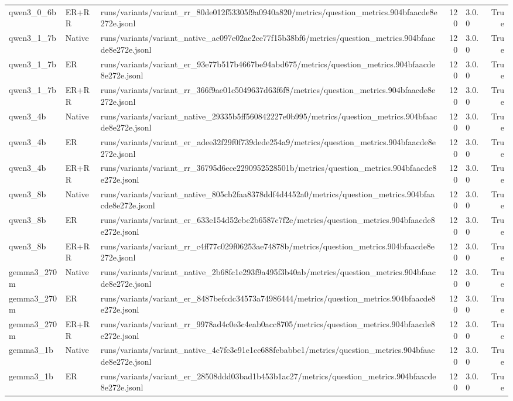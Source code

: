 \begin{tabular}{lllrlr}
qwen3_0_6b & ER+RR & runs/variants/variant_rr_80de012f53305f9a0940a820/metrics/question_metrics.904bfaacde8e272e.jsonl & 120 & 3.0.0 & True \\
qwen3_1_7b & Native & runs/variants/variant_native_ac097e02ae2ce77f15b38bf6/metrics/question_metrics.904bfaacde8e272e.jsonl & 120 & 3.0.0 & True \\
qwen3_1_7b & ER & runs/variants/variant_er_93e77b517b4667be94abd675/metrics/question_metrics.904bfaacde8e272e.jsonl & 120 & 3.0.0 & True \\
qwen3_1_7b & ER+RR & runs/variants/variant_rr_366f9ae01c5049637d63f6f8/metrics/question_metrics.904bfaacde8e272e.jsonl & 120 & 3.0.0 & True \\
qwen3_4b & Native & runs/variants/variant_native_29335b5ff560842227e0b995/metrics/question_metrics.904bfaacde8e272e.jsonl & 120 & 3.0.0 & True \\
qwen3_4b & ER & runs/variants/variant_er_adee32f29f0f739dede254a9/metrics/question_metrics.904bfaacde8e272e.jsonl & 120 & 3.0.0 & True \\
qwen3_4b & ER+RR & runs/variants/variant_rr_36795d6ece2290952528501b/metrics/question_metrics.904bfaacde8e272e.jsonl & 120 & 3.0.0 & True \\
qwen3_8b & Native & runs/variants/variant_native_805cb2faa8378ddf4d4452a0/metrics/question_metrics.904bfaacde8e272e.jsonl & 120 & 3.0.0 & True \\
qwen3_8b & ER & runs/variants/variant_er_633e154d52ebc2b6587c7f2e/metrics/question_metrics.904bfaacde8e272e.jsonl & 120 & 3.0.0 & True \\
qwen3_8b & ER+RR & runs/variants/variant_rr_c4ff77c029f06253ae74878b/metrics/question_metrics.904bfaacde8e272e.jsonl & 120 & 3.0.0 & True \\
gemma3_270m & Native & runs/variants/variant_native_2b68fc1e293f9a495f3b40ab/metrics/question_metrics.904bfaacde8e272e.jsonl & 120 & 3.0.0 & True \\
gemma3_270m & ER & runs/variants/variant_er_8487befcdc34573a74986444/metrics/question_metrics.904bfaacde8e272e.jsonl & 120 & 3.0.0 & True \\
gemma3_270m & ER+RR & runs/variants/variant_rr_9978ad4c0e3c4eab0acc8705/metrics/question_metrics.904bfaacde8e272e.jsonl & 120 & 3.0.0 & True \\
gemma3_1b & Native & runs/variants/variant_native_4c7fe3e91e1ce688febabbe1/metrics/question_metrics.904bfaacde8e272e.jsonl & 120 & 3.0.0 & True \\
gemma3_1b & ER & runs/variants/variant_er_28508ddd03bad1b453b1ac27/metrics/question_metrics.904bfaacde8e272e.jsonl & 120 & 3.0.0 & True \\

\end{tabular}
